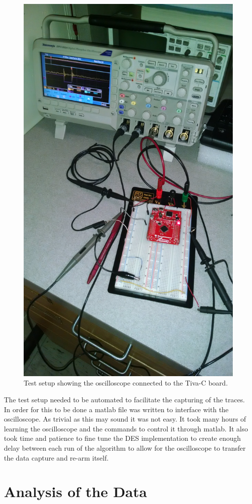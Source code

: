 	\begin{figure}[h]
	\centering
	\includegraphics[width=0.7\linewidth]{./bench}
	\caption{Test setup showing the oscilloscope connected to the Tiva-C board.}
	\label{fig:bench}
	\end{figure}
	
	The test setup needed to be automated to facilitate the capturing of the traces.  In order for this to be done a matlab file was written to interface with the oscilloscope.  As trivial as this may sound it was not easy.  It took many hours of learning the oscilloscope and the commands to control it through matlab.  It also took time and patience to fine tune the DES implementation to create enough delay between each run of the algorithm to allow for the oscilloscope to transfer the data capture and re-arm itself.
	

\section{Analysis of the Data}\label{sec::analysis} 
